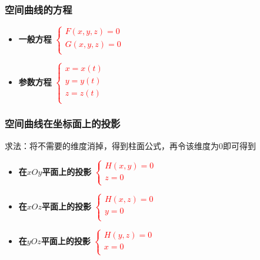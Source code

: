 \documentclass{article} %
\begin{document}
\subsubsection{空间曲线的方程}
\begin{itemize}
    \item \textbf{一般方程}\hspace{2mm}\textcolor{red}{
        $\left\{\begin{array}{l}
            F(x,y,z)=0 \\
            G(x,y,z)=0 \\
        \end{array}\right.$
    }

    \item \textbf{参数方程}\hspace{2mm}\textcolor{red}{
        $\left\{\begin{array}{l}
            x=x(t) \\
            y=y(t) \\
            z=z(t) \\
        \end{array}\right.$
    }
\end{itemize}

\subsubsection{空间曲线在坐标面上的投影}
求法：将不需要的维度消掉，得到柱面公式，再令该维度为0即可得到
\begin{itemize}
    \item \textbf{在$xOy$平面上的投影}\hspace{2mm}\textcolor{red}{
        $\left\{\begin{array}{l}
            H(x,y)=0 \\
            z=0 \\
        \end{array}\right.$
    }

    \item \textbf{在$xOz$平面上的投影}\hspace{2mm}\textcolor{red}{
        $\left\{\begin{array}{l}
            H(x,z)=0 \\
            y=0 \\
        \end{array}\right.$
    }

    \item \textbf{在$yOz$平面上的投影}\hspace{2mm}\textcolor{red}{
        $\left\{\begin{array}{l}
            H(y,z)=0 \\
            x=0 \\
        \end{array}\right.$
    }
\end{itemize}
\end{document}
